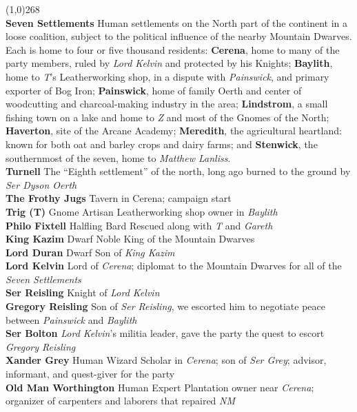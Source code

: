 \documentclass[letterpaper]{article}
\newcommand{\colline}{\noindent\line(1,0){268} \\}
\newcommand{\e}[1]{\emph{#1}}
\newcommand{\B}[1]{\textbf{#1}}
\newenvironment{notesection}[1]
{\noindent {\huge \B{#1}} \par
\vspace{-0.75em}
\colline
\begingroup\fontsize{9pt}{12pt}\selectfont}
{\endgroup}
\newcommand{\person}[3]{\noindent\B{#1
    \ifstrequal{#2}{M}{{\color{ProcessBlue}\male}}{%
    \ifstrequal{#2}{F}{\color{VioletRed}\female}{}}}{\scriptsize #3}}
\begin{document}
\twocolumn
\begin{notesection}{People and Places}
\B{Seven Settlements} Human settlements on the North part of the continent in a loose coalition, subject to the political influence of the nearby Mountain Dwarves. Each is home to four or five thousand residents: \B{Cerena}, home to many of the party members, ruled by \e{Lord Kelvin} and protected by his Knights; \B{Baylith}, home to \e{T}'s Leatherworking shop, in a dispute with \e{Painswick}, and primary exporter of Bog Iron; \B{Painswick}, home of family Oerth and center of woodcutting and charcoal-making industry in the area; \B{Lindstrom}, a small fishing town on a lake and home to \e{Z} and most of the Gnomes of the North; \B{Haverton}, site of the Arcane Academy; \B{Meredith}, the agricultural heartland: known for both oat and barley crops and dairy farms; and \B{Stenwick}, the southernmost of the seven, home to \e{Matthew Lanliss}.\\
\B{Turnell} The ``Eighth settlement'' of the north, long ago burned to the ground by \e{Ser Dyson Oerth} \\
\B{The Frothy Jugs} Tavern in Cerena; campaign start\\
\person{Trig (T)}{F}{Gnome Artisan} Leatherworking shop owner in \e{Baylith} \\
\person{Philo Fixtell}{M}{Halfling Bard} Rescued along with \e{T} and \e{Gareth}\\
\person{King Kazim}{M}{Dwarf Noble} King of the Mountain Dwarves\\
\person{Lord Duran}{M}{Dwarf} Son of \e{King Kazim}\\
\person{Lord Kelvin}{M}{} Lord of \e{Cerena}; diplomat to the Mountain Dwarves for all of the \e{Seven Settlements}\\
\person{Ser Reisling}{M}{} Knight of \e{Lord Kelvin}\\
\person{Gregory Reisling}{M}{} Son of \e{Ser Reisling}, we escorted him to negotiate peace between \e{Painswick} and \e{Baylith}\\
\person{Ser Bolton}{M}{} \e{Lord Kelvin}'s militia leader, gave the party the quest to escort \e{Gregory Reisling} \\
\person{Xander Grey}{M}{Human Wizard} Scholar in \e{Cerena}; son of \e{Ser Grey}; advisor, informant, and quest-giver for the party\\
\person{Old Man Worthington}{M}{Human Expert} Plantation owner near \e{Cerena}; organizer of carpenters and laborers that repaired \e{NM}\\

\end{notesection}
\end{document}
